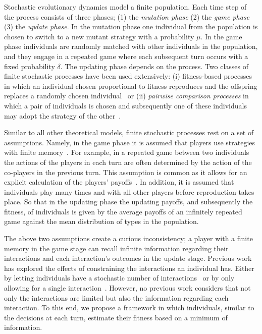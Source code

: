 \documentclass[11pt]{article}
\theoremstyle{plainCl1}
\theoremstyle{plainCl2}
\begin{document}
Stochastic evolutionary dynamics model a finite population. Each
time step of the process consists of three phases; (1) the \textit{mutation
phase} (2) the \textit{game phase} (3) the \textit{update phase}. In the
mutation phase one individual from the population is chosen to switch to a new
mutant strategy with a probability \(\mu\). In the game phase individuals are
randomly matched with other individuals in the population, and they engage in a
repeated game where each subsequent turn occurs with a fixed probability
\(\delta\). The updating phase depends on the process. Two classes of
finite stochastic processes have been used extensively: (i) fitness-based
processes in which an individual chosen proportional to fitness reproduces and
the offspring replaces a randomly chosen individual~\cite{nowak:Nature:2004} or
(ii) \textit{pairwise comparison processes} in which a pair of individuals is
chosen and subsequently one of these individuals may adopt the strategy of the
other~\cite{traulsen2007pairwise}.

Similar to all other theoretical models, finite stochastic processes rest on a
set of assumptions. Namely, in the game phase it is assumed that players use
strategies with finite memory~\cite{Nowak1992tit, Baek2016}. For example, in a
repeated game between two individuals the actions of the players in each turn
are often determined by the action of the co-players in the previous turn. This
assumption is common as it allows for an explicit calculation of the players'
payoffs~\cite{sigmund2010calculus}. In addition, it is
assumed that individuals play many times and with all other players before
reproduction takes place. So that in the updating phase the updating payoffs, and
subsequently the fitness, of individuals is given by the average payoffs of an
infinitely repeated game against the mean distribution of types in the
population.

The above two assumptions create a curious inconsistency; a player with a finite
memory in the game stage can recall infinite information regarding their
interactions and each interaction's outcomes in the update stage. Previous work
has explored the effects of constraining the interactions an individual has.
Either by letting individuals have a stochastic number of
interactions~\cite{roca:PhysicalReview:2006, sanchez:JTB:2005,
Traulsen:JTB:2007} or by only allowing for
a single interaction~\cite{Woelfing:JTB:2009}. However, no previous work
considers that not only the interactions are limited but also the information
regarding each interaction. To this end, we propose a framework in which
individuals, similar to the decisions at each turn, estimate their fitness based
on a minimum of information.
\end{document}
